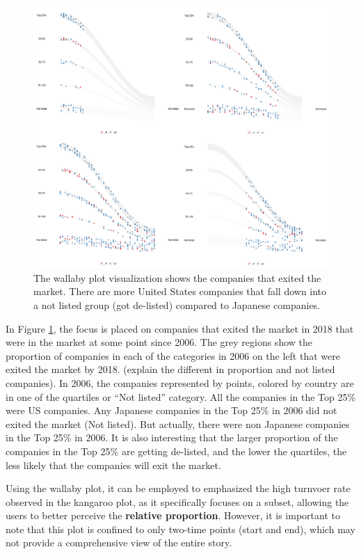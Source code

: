 \begin{figure}

{\centering \includegraphics[width=1\linewidth]{figures/animation-exit} 

}

\caption{The wallaby plot visualization shows the companies that exited the market. There are more United States companies that fall down into a not listed group (got de-listed) compared to Japanese companies.}\label{fig:osiris-figure}
\end{figure}

In Figure \ref{fig:osiris-figure}, the focus is placed on companies that exited the market in 2018 that were in the market at some point since 2006. The grey regions show the proportion of companies in each of the categories in 2006 on the left that were exited the market by 2018. (explain the different in proportion and not listed companies). In 2006, the companies represented by points, colored by country are in one of the quartiles or ``Not listed'' category. All the companies in the Top 25\% were US companies. Any Japanese companies in the Top 25\% in 2006 did not exited the market (Not listed). But actually, there were non Japanese companies in the Top 25\% in 2006. It is also interesting that the larger proportion of the companies in the Top 25\% are getting de-listed, and the lower the quartiles, the less likely that the companies will exit the market.

Using the wallaby plot, it can be employed to emphasized the high turnvoer rate observed in the kangaroo plot, as it specifically focuses on a subset, allowing the users to better perceive the \textbf{relative proportion}. However, it is important to note that this plot is confined to only two-time points (start and end), which may not provide a comprehensive view of the entire story.


